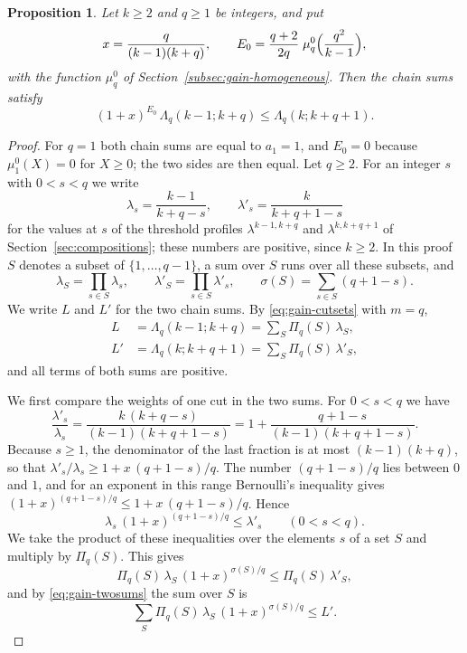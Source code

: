 \documentclass{amsart}
\newtheorem{proposition}[theorem]{Proposition}
\theoremstyle{definition}
\theoremstyle{remark}
\numberwithin{equation}{section}
\begin{document}
\begin{proposition}\label{prop:boundarygain}
Let $k\ge2$ and $q\ge1$ be integers, and put
\[
x=\frac{q}{(k-1)(k+q)},\qquad
E_0=\frac{q+2}{2q}\;\mu^0_q\Bigl(\frac{q^2}{k-1}\Bigr),
\]
with the function $\mu^0_q$ of Section~\ref{subsec:gain-homogeneous}. Then
the chain sums satisfy
\[
(1+x)^{E_0}\,\Lambda_q(k-1;k+q)\le\Lambda_q(k;k+q+1).
\]
\end{proposition}

\begin{proof}
For $q=1$ both chain sums are equal to $a_1=1$, and $E_0=0$ because
$\mu^0_1(X)=0$ for $X\ge0$; the two sides are then equal. Let $q\ge2$. For
an integer $s$ with $0<s<q$ we write
\[
\lambda_s=\frac{k-1}{k+q-s},\qquad\lambda'_s=\frac{k}{k+q+1-s}
\]
for the values at $s$ of the threshold profiles $\lambda^{k-1,k+q}$ and
$\lambda^{k,k+q+1}$ of Section~\ref{sec:compositions}; these numbers are
positive, since $k\ge2$. In this
proof $S$ denotes a subset of $\{1,\dots,q-1\}$, a sum over $S$ runs over all
these subsets, and
\[
\lambda_S=\prod_{s\in S}\lambda_s,\qquad
\lambda'_S=\prod_{s\in S}\lambda'_s,\qquad
\sigma(S)=\sum_{s\in S}(q+1-s).
\]
We write $L$ and $L'$ for the two chain sums. By \eqref{eq:gain-cutsets}
with $m=q$,
\begin{equation}\label{eq:gain-twosums}
\begin{split}
L&=\Lambda_q(k-1;k+q)=\sum_{S}\Pi_q(S)\,\lambda_S,\\
L'&=\Lambda_q(k;k+q+1)=\sum_{S}\Pi_q(S)\,\lambda'_S,
\end{split}
\end{equation}
and all terms of both sums are positive.

We first compare the weights of one cut in the two sums. For $0<s<q$ we have
\[
\frac{\lambda'_s}{\lambda_s}=\frac{k\,(k+q-s)}{(k-1)(k+q+1-s)}
=1+\frac{q+1-s}{(k-1)(k+q+1-s)}.
\]
Because $s\ge1$, the denominator of the last fraction is at most
$(k-1)(k+q)$, so that $\lambda'_s/\lambda_s\ge1+x\,(q+1-s)/q$. The number
$(q+1-s)/q$ lies between $0$ and $1$, and for an exponent in this range
Bernoulli's inequality gives $(1+x)^{(q+1-s)/q}\le1+x\,(q+1-s)/q$. Hence
\[
\lambda_s\,(1+x)^{(q+1-s)/q}\le\lambda'_s\qquad(0<s<q).
\]
We take the product of these inequalities over the elements $s$ of a set $S$
and multiply by $\Pi_q(S)$. This gives
\[
\Pi_q(S)\,\lambda_S\,(1+x)^{\sigma(S)/q}\le\Pi_q(S)\,\lambda'_S,
\]
and by \eqref{eq:gain-twosums} the sum over $S$ is
\begin{equation}\label{eq:gain-setgain}
\sum_{S}\Pi_q(S)\,\lambda_S\,(1+x)^{\sigma(S)/q}\le L'.
\end{equation}


\end{proof}
\end{document}
